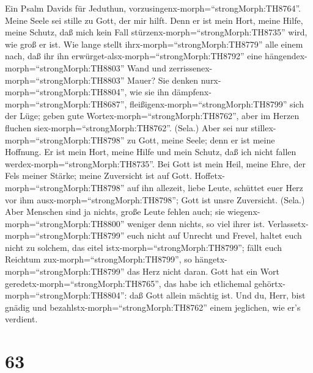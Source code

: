 Ein Psalm Davids für Jeduthun,
vorzusingenx-morph=``strongMorph:TH8764''. Meine Seele sei stille zu
Gott, der mir hilft.  Denn er ist mein Hort, meine Hilfe,
meine Schutz, daß mich kein Fall stürzenx-morph=``strongMorph:TH8735''
wird, wie groß er ist.  Wie lange stellt
ihrx-morph=``strongMorph:TH8779'' alle einem nach, daß ihr ihn
erwürget-alsx-morph=``strongMorph:TH8792'' eine
hängendex-morph=``strongMorph:TH8803'' Wand und
zerrissenex-morph=``strongMorph:TH8803'' Mauer?  Sie denken
nurx-morph=``strongMorph:TH8804'', wie sie ihn
dämpfenx-morph=``strongMorph:TH8687'',
fleißigenx-morph=``strongMorph:TH8799'' sich der Lüge; geben gute
Wortex-morph=``strongMorph:TH8762'', aber im Herzen fluchen
siex-morph=``strongMorph:TH8762''. (Sela.)  Aber sei nur
stillex-morph=``strongMorph:TH8798'' zu Gott, meine Seele; denn er ist
meine Hoffnung.  Er ist mein Hort, meine Hilfe und mein
Schutz, daß ich nicht fallen werdex-morph=``strongMorph:TH8735''.
 Bei Gott ist mein Heil, meine Ehre, der Fels meiner Stärke;
meine Zuversicht ist auf Gott. 
Hoffetx-morph=``strongMorph:TH8798'' auf ihn allezeit, liebe Leute,
schüttet euer Herz vor ihm ausx-morph=``strongMorph:TH8798''; Gott ist
unsre Zuversicht. (Sela.)  Aber Menschen sind ja nichts,
große Leute fehlen auch; sie wiegenx-morph=``strongMorph:TH8800''
weniger denn nichts, so viel ihrer ist. 
Verlassetx-morph=``strongMorph:TH8799'' euch nicht auf Unrecht und
Frevel, haltet euch nicht zu solchem, das eitel
istx-morph=``strongMorph:TH8799''; fällt euch Reichtum
zux-morph=``strongMorph:TH8799'', so
hängetx-morph=``strongMorph:TH8799'' das Herz nicht daran. 
Gott hat ein Wort geredetx-morph=``strongMorph:TH8765'', das habe ich
etlichemal gehörtx-morph=``strongMorph:TH8804'': daß Gott allein mächtig
ist.  Und du, Herr, bist gnädig und
bezahlstx-morph=``strongMorph:TH8762'' einem jeglichen, wie er's
verdient.

\hypertarget{section-62}{%
\section{63}\label{section-62}}

